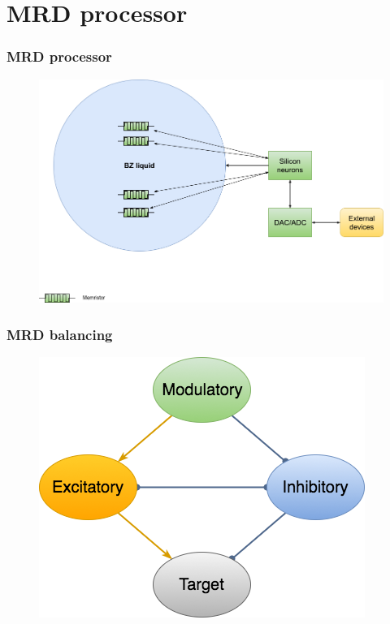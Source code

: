 \documentclass[12pt, aspectratio=169]{beamer}
\begin{document}
\section{MRD processor}

\begin{frame}
  \frametitle{MRD processor}
  
\begin{figure}
\includegraphics[width=0.8\linewidth]{MRD_silicon_neurons}
\end{figure}

\end{frame}


\begin{frame}
  \frametitle{MRD balancing}
  
\begin{figure}
\includegraphics[width=0.6\linewidth]{MRD_balancing}
\end{figure}

\end{frame}

\end{document}
